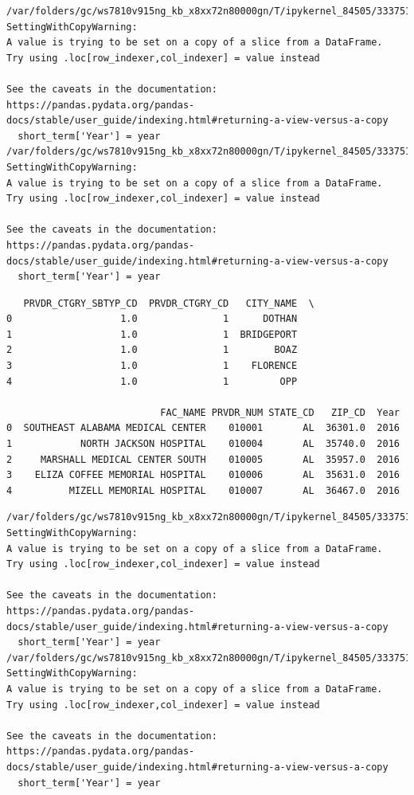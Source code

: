 \documentclass[
  letterpaper,
  DIV=11,
  numbers=noendperiod]{scrartcl}
\begin{document}
\begin{verbatim}
/var/folders/gc/ws7810v915ng_kb_x8xx72n80000gn/T/ipykernel_84505/3337511794.py:17: SettingWithCopyWarning: 
A value is trying to be set on a copy of a slice from a DataFrame.
Try using .loc[row_indexer,col_indexer] = value instead

See the caveats in the documentation: https://pandas.pydata.org/pandas-docs/stable/user_guide/indexing.html#returning-a-view-versus-a-copy
  short_term['Year'] = year
/var/folders/gc/ws7810v915ng_kb_x8xx72n80000gn/T/ipykernel_84505/3337511794.py:17: SettingWithCopyWarning: 
A value is trying to be set on a copy of a slice from a DataFrame.
Try using .loc[row_indexer,col_indexer] = value instead

See the caveats in the documentation: https://pandas.pydata.org/pandas-docs/stable/user_guide/indexing.html#returning-a-view-versus-a-copy
  short_term['Year'] = year
\end{verbatim}

\begin{verbatim}
   PRVDR_CTGRY_SBTYP_CD  PRVDR_CTGRY_CD   CITY_NAME  \
0                   1.0               1      DOTHAN   
1                   1.0               1  BRIDGEPORT   
2                   1.0               1        BOAZ   
3                   1.0               1    FLORENCE   
4                   1.0               1         OPP   

                           FAC_NAME PRVDR_NUM STATE_CD   ZIP_CD  Year  
0  SOUTHEAST ALABAMA MEDICAL CENTER    010001       AL  36301.0  2016  
1            NORTH JACKSON HOSPITAL    010004       AL  35740.0  2016  
2     MARSHALL MEDICAL CENTER SOUTH    010005       AL  35957.0  2016  
3    ELIZA COFFEE MEMORIAL HOSPITAL    010006       AL  35631.0  2016  
4          MIZELL MEMORIAL HOSPITAL    010007       AL  36467.0  2016  
\end{verbatim}

\begin{verbatim}
/var/folders/gc/ws7810v915ng_kb_x8xx72n80000gn/T/ipykernel_84505/3337511794.py:17: SettingWithCopyWarning: 
A value is trying to be set on a copy of a slice from a DataFrame.
Try using .loc[row_indexer,col_indexer] = value instead

See the caveats in the documentation: https://pandas.pydata.org/pandas-docs/stable/user_guide/indexing.html#returning-a-view-versus-a-copy
  short_term['Year'] = year
/var/folders/gc/ws7810v915ng_kb_x8xx72n80000gn/T/ipykernel_84505/3337511794.py:17: SettingWithCopyWarning: 
A value is trying to be set on a copy of a slice from a DataFrame.
Try using .loc[row_indexer,col_indexer] = value instead

See the caveats in the documentation: https://pandas.pydata.org/pandas-docs/stable/user_guide/indexing.html#returning-a-view-versus-a-copy
  short_term['Year'] = year
\end{verbatim}
\end{document}
